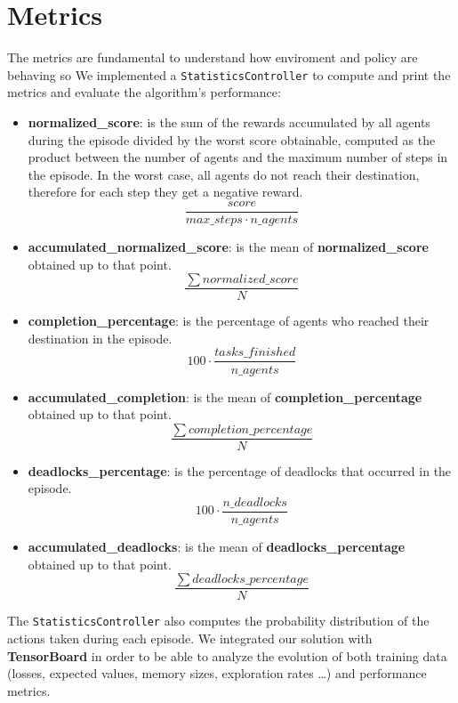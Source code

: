 \section{Metrics}
The metrics are fundamental to understand how enviroment and policy are behaving so  We implemented a \texttt{StatisticsController} to compute and print the metrics and evaluate the algorithm’s performance:
\begin{itemize}
	\item \textbf{normalized\_score}: is the sum of the rewards accumulated by all agents during the episode divided by the worst score obtainable, computed as the product between the number of agents and the maximum number of steps in the episode.
	In the worst case, all agents do not reach their destination, therefore for each step they get a negative reward.
	\begin{equation}{\frac{score}{max\_steps \cdot n\_agents}}\label{eq:score}\end{equation}
	\item \textbf{accumulated\_normalized\_score}: is the mean of \textbf{normalized\_score} obtained up to that point.
	\begin{equation}{\frac{\sum{normalized\_score}}{N}}\label{eq:score_acc}\end{equation}
	\item \textbf{completion\_percentage}: is the percentage of agents who reached their destination in the episode.
	\begin{equation}{100 \cdot {\frac{tasks\_finished}{n\_agents}}}\label{eq:compl_perc}\end{equation}
	\item \textbf{accumulated\_completion}: is the mean of \textbf{completion\_percentage} obtained up to that point.
	\begin{equation}{\frac{\sum{completion\_percentage}}{N}}\label{eq:compl_acc}\end{equation}
	\item \textbf{deadlocks\_percentage}: is the percentage of deadlocks that occurred in the episode.
	\begin{equation}{100 \cdot {\frac{n\_deadlocks}{n\_agents}}}\label{eq:deads_perc}\end{equation}
	\item \textbf{accumulated\_deadlocks}: is the mean of \textbf{deadlocks\_percentage} obtained up to that point.
	\begin{equation}{\frac{\sum {deadlocks\_percentage}}{N}}\label{eq:deads_acc}\end{equation}
\end{itemize}
The \texttt{StatisticsController} also computes the probability distribution of the actions taken during each episode.
We integrated our solution with \textbf{TensorBoard} in order to be able to analyze the evolution of both training data (losses, expected values, memory sizes, exploration rates \ldots) and performance metrics.
